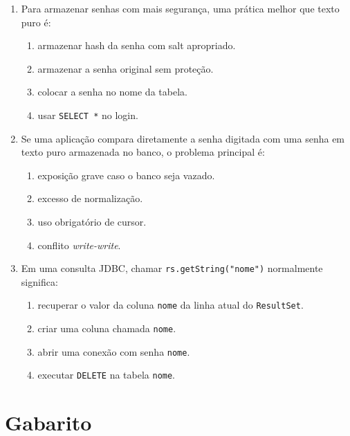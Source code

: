 \documentclass[12pt,a4paper]{article}
\begin{document}
\begin{enumerate}[resume,label=\textbf{Q\arabic*.}]
\item Para armazenar senhas com mais segurança, uma prática melhor que texto puro é:

\begin{enumerate}[label=\alph*)]
    \item armazenar hash da senha com salt apropriado.
    \item armazenar a senha original sem proteção.
    \item colocar a senha no nome da tabela.
    \item usar \texttt{SELECT *} no login.
\end{enumerate}

\item Se uma aplicação compara diretamente a senha digitada com uma senha em texto puro armazenada no banco, o problema principal é:

\begin{enumerate}[label=\alph*)]
    \item exposição grave caso o banco seja vazado.
    \item excesso de normalização.
    \item uso obrigatório de cursor.
    \item conflito \textit{write-write}.
\end{enumerate}

\item Em uma consulta JDBC, chamar \texttt{rs.getString("nome")} normalmente significa:

\begin{enumerate}[label=\alph*)]
    \item recuperar o valor da coluna \texttt{nome} da linha atual do \texttt{ResultSet}.
    \item criar uma coluna chamada \texttt{nome}.
    \item abrir uma conexão com senha \texttt{nome}.
    \item executar \texttt{DELETE} na tabela \texttt{nome}.
\end{enumerate}


\end{enumerate}

\newpage

\section*{Gabarito}
\end{document}
